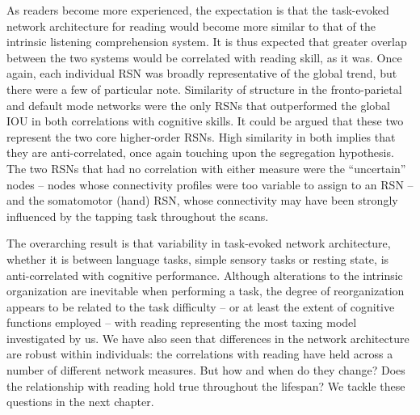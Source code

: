 As readers become more experienced, the expectation is that the task-evoked network architecture for reading would become more similar to that of the intrinsic listening comprehension system. It is thus expected that greater overlap between the two systems would be correlated with reading skill, as it was. Once again, each individual RSN was broadly representative of the global trend, but there were a few of particular note. Similarity of structure in the fronto-parietal and default mode networks were the only RSNs that outperformed the global IOU in both correlations with cognitive skills. It could be argued that these two represent the two core higher-order RSNs. High similarity in both implies that they are anti-correlated, once again touching upon the segregation hypothesis. The two RSNs that had no correlation with either measure were the ``uncertain'' nodes -- nodes whose connectivity profiles were too variable to assign to an RSN -- and the somatomotor (hand) RSN, whose connectivity may have been strongly influenced by the tapping task throughout the scans. 

%
The overarching result is that variability in task-evoked network architecture, whether it is between language tasks, simple sensory tasks or resting state, is anti-correlated with cognitive performance. Although alterations to the intrinsic organization are inevitable when performing a task, the degree of reorganization appears to be related to the task difficulty -- or at least the extent of cognitive functions employed -- with reading representing the most taxing model investigated by us. We have also seen that differences in the network architecture are robust within individuals: the correlations with reading have held across a number of different network measures. But how and when do they change? Does the relationship with reading hold true throughout the lifespan? We tackle these questions in the next chapter. 